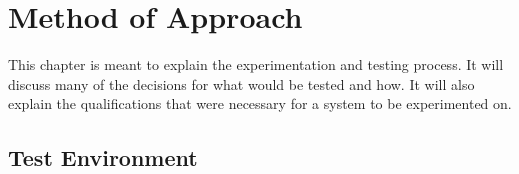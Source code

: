 %
%
%
\chapter{Method of Approach} \label{ch:method}
This chapter is meant to explain the experimentation and testing process. It will discuss many of the decisions for what would be tested and how. It will also explain the qualifications that were necessary for a system to be experimented on.

\section{Test Environment}
